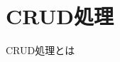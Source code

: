 \documentclass[../../../main]{subfiles}
\begin{document}
    \section{CRUD処理}\label{sec:phraseology-crud}

    CRUD処理とは
\end{document}
